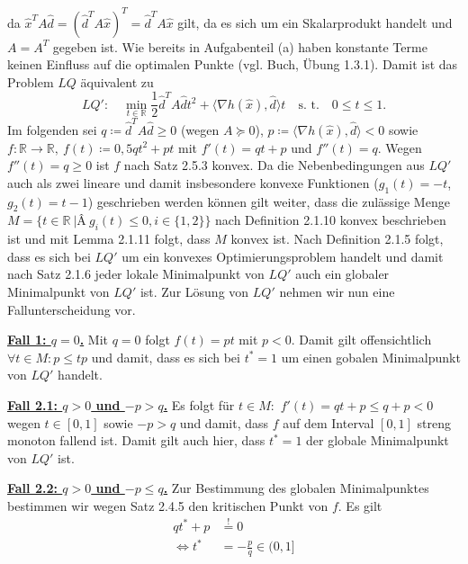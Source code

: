 \documentclass[ngerman, a4paper,12pt]{article}
\begin{document}
da $\hat{x}^TA\hat{d} = (\hat{d}^TA\hat{x})^T =  \hat{d}^TA\hat{x}$ gilt, da es sich um ein Skalarprodukt handelt und $A=A^T$ gegeben ist. Wie bereits in Aufgabenteil (a) haben konstante Terme keinen Einfluss auf die optimalen Punkte (vgl. Buch, Übung 1.3.1). Damit ist das Problem $LQ$ äquivalent zu
\begin{equation*}
	LQ': \quad \min_{t \in \mathbb{R}} \frac{1}{2} \hat{d}^TA\hat{d}t^2 + \langle \nabla h(\hat{x}), \hat{d} \rangle t \quad \text{s. t.} \quad 0\leq t \leq 1.
\end{equation*}
Im folgenden sei $q \coloneqq \hat{d}^TA\hat{d}\geq 0$ (wegen $A \succeq 0$), $p \coloneqq \langle \nabla h(\hat{x}), \hat{d} \rangle < 0$ sowie $f: \mathbb{R} \rightarrow \mathbb{R}, \ f(t) \coloneqq 0,5qt^2+pt$ mit $f'(t)=qt+p$ und $f''(t)=q$. Wegen $f''(t)=q\geq 0$ ist $f$ nach Satz 2.5.3 konvex. Da die Nebenbedingungen aus $LQ'$ auch als zwei lineare und damit insbesondere konvexe Funktionen ($g_1(t)=-t$, $g_2(t)=t-1$) geschrieben werden können gilt weiter, dass die zulässige Menge $M = \{t \in \mathbb{R} \ |Â \ g_i(t) \leq 0, i\in \{1,2\} \}$ nach Definition 2.1.10 konvex beschrieben ist und mit Lemma 2.1.11 folgt, dass $M$ konvex ist. Nach Definition 2.1.5 folgt, dass es sich bei $LQ'$ um ein konvexes Optimierungsproblem handelt und damit nach Satz 2.1.6 jeder lokale Minimalpunkt von $LQ'$ auch ein globaler Minimalpunkt von $LQ'$ ist. Zur Lösung von $LQ'$ nehmen wir nun eine Fallunterscheidung vor. \par
\textbf{\underline{Fall 1: $q = 0$.}}
Mit $q=0$ folgt $f(t)=pt$ mit $p<0$. Damit gilt offensichtlich $\forall t \in M: p \leq tp$ und damit, dass es sich bei $t^*=1$ um einen gobalen Minimalpunkt von $LQ'$ handelt. \par
\textbf{\underline{Fall 2.1: $q > 0$ und $-p > q$.}} Es folgt für $t \in M:$ $f'(t)=qt+p \leq q+p < 0$ wegen $t \in [0,1]$ sowie $-p > q$ und damit, dass $f$ auf dem Interval $[0,1]$ streng monoton fallend ist. Damit gilt auch hier, dass $t^*=1$ der globale Minimalpunkt von $LQ'$ ist.%
\par
\textbf{\underline{Fall 2.2: $q > 0$ und $-p \leq q$.}} Zur Bestimmung des globalen Minimalpunktes bestimmen wir wegen Satz 2.4.5 den kritischen Punkt von $f$. Es gilt
\begin{equation*}
	\begin{split}
		qt^*+p &\stackrel{!}{=} 0 \\
	\Leftrightarrow	t^* &= -\frac{p}{q} \in (0,1]
	\end{split}
\end{equation*}
\end{document}
